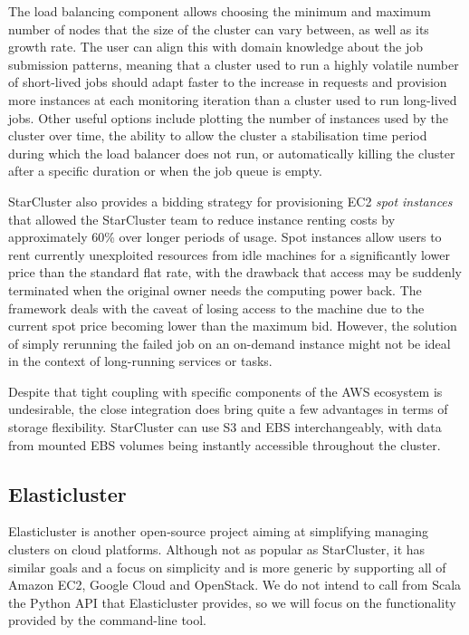 The load balancing component allows choosing the minimum and maximum number of nodes that the size of the cluster can vary between, as well as its growth rate. The user can align this with domain knowledge about the job submission patterns, meaning that a cluster used to run a highly volatile number of short-lived jobs should adapt faster to the increase in requests and provision more instances at each monitoring iteration than a cluster used to run long-lived jobs. Other useful options include plotting the number of instances used by the cluster over time, the ability to allow the cluster a stabilisation time period during which the load balancer does not run, or automatically killing the cluster after a specific duration or when the job queue is empty.

StarCluster also provides a bidding strategy for provisioning EC2 \textit{spot instances} that allowed the StarCluster team to reduce instance renting costs by approximately 60\% over longer periods of usage. Spot instances allow users to rent currently unexploited resources from idle machines for a significantly lower price than the standard flat rate, with the drawback that access may be suddenly terminated when the original owner needs the computing power back. The framework deals with the caveat of losing access to the machine due to the current spot price becoming lower than the maximum bid. However, the solution of simply rerunning the failed job on an on-demand instance might not be ideal in the context of long-running services or tasks.

Despite that tight coupling with specific components of the AWS ecosystem is undesirable, the close integration does bring quite a few advantages in terms of storage flexibility. StarCluster can use S3 and EBS interchangeably, with data from mounted EBS volumes being instantly accessible throughout the cluster.

\subsection{Elasticluster}

Elasticluster \cite{Elasticluster} is another open-source project aiming at simplifying managing clusters on cloud platforms. Although not as popular as StarCluster, it has similar goals and a focus on simplicity and is more generic by supporting all of Amazon EC2, Google Cloud and OpenStack. We do not intend to call from Scala the Python API that Elasticluster provides, so we will focus on the functionality provided by the command-line tool.

